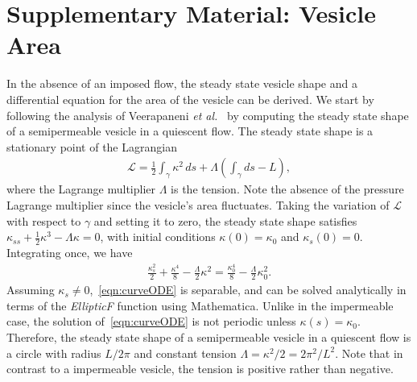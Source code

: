 \documentclass[9pt,twocolumn,twoside,lineno]{pnas-new}
\begin{document}
\section*{Supplementary Material: Vesicle Area}
In the absence of an imposed flow, the steady state vesicle shape and a
differential equation for the area of the vesicle can be derived. We
start by following the analysis of Veerapaneni {\em et
al.}~\cite{vee-raj-bir-pur2009} by computing the steady state shape of a
semipermeable vesicle in a quiescent flow. The steady state shape is a
stationary point of the Lagrangian
\begin{align}
  \mathcal{L} = \frac{1}{2}\int_{\gamma} \kappa^2 \, ds +
    \Lambda \left(\int_{\gamma} ds  - L \right),
\end{align}
where the Lagrange multiplier $\Lambda$ is the tension. Note the absence
of the pressure Lagrange multiplier since the vesicle's area fluctuates.
Taking the variation of $\mathcal{L}$ with respect to $\gamma$ and
setting it to zero, the steady state shape satisfies $\kappa_{ss} +
\frac{1}{2}\kappa^3 - \Lambda \kappa = 0$, with initial conditions
$\kappa(0) = \kappa_0$ and $\kappa_s(0) = 0$.  Integrating once, we have
\begin{align}
  \frac{\kappa_s^2}{2} + \frac{\kappa^4}{8} - 
    \frac{\Lambda}{2}\kappa^2 = \frac{\kappa_0^4}{8} - 
    \frac{\Lambda}{2}\kappa_0^2.
  \label{eqn:curveODE}
\end{align}
Assuming $\kappa_s \neq 0$,~\eqref{eqn:curveODE} is separable, and can
be solved analytically in terms of the {\em EllipticF} function using
Mathematica. Unlike in the impermeable case, the solution
of~\eqref{eqn:curveODE} is not periodic unless $\kappa(s) = \kappa_0$.
Therefore, the steady state shape of a semipermeable vesicle in a
quiescent flow is a circle with radius $L/2\pi$ and constant tension
$\Lambda = \kappa^2/2 = 2\pi^2/L^2.$ Note that in contrast to a
impermeable vesicle, the tension is positive rather than negative.
\end{document}
